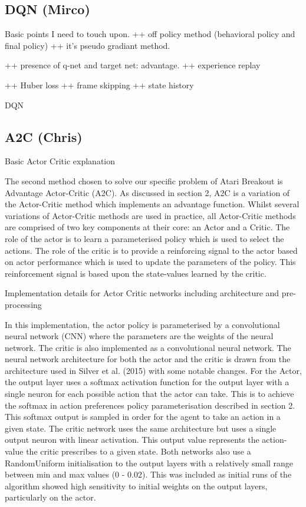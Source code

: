 \documentclass{article}
\begin{document}
\subsection{DQN (Mirco)}
Basic points I need to touch upon.
++ off policy method (behavioral policy and final policy)
++ it's pseudo gradiant method.

++ presence of q-net and target net: advantage.
++ experience replay

++ Huber loss
++ frame skipping
++ state history

DQN 




\subsection{A2C (Chris)}


Basic Actor Critic explanation

The second method chosen to solve our specific problem of Atari Breakout is Advantage Actor-Critic (A2C). As discussed in section 2, A2C is a variation of the Actor-Critic method which implements an advantage function. Whilst several variations of Actor-Critic methods are used in practice, all Actor-Critic methods are comprised of two key components at their core: an Actor and a Critic. The role of the actor is to learn a parameterised policy which is used to select the actions. The role of the critic is to provide a reinforcing signal to the actor based on actor performance which is used to update the parameters of the policy. This reinforcement signal is based upon the state-values learned by the critic.

Implementation details for Actor Critic networks including architecture and pre-processing

In this implementation, the actor policy is parameterised by a convolutional neural network (CNN) where the parameters are the weights of the neural network. The critic is also implemented as a convolutional neural network. The neural network architecture for both the actor and the critic is drawn from the architecture used in Silver et al. (2015) with some notable changes. For the Actor, the output layer uses a softmax activation function for the output layer with a single neuron for each possible action that the actor can take. This is to achieve the softmax in action preferences policy parameterisation described in section 2. This softmax output is sampled in order for the agent to take an action in a given state. The critic network uses the same architecture but uses a single output neuron with linear activation. This output value represents the action-value the critic prescribes to a given state. Both networks also use a RandomUniform initialisation to the output layers with a relatively small range between min and max values (0 - 0.02). This was included as initial runs of the algorithm showed high sensitivity to initial weights on the output layers, particularly on the actor.
\end{document}
